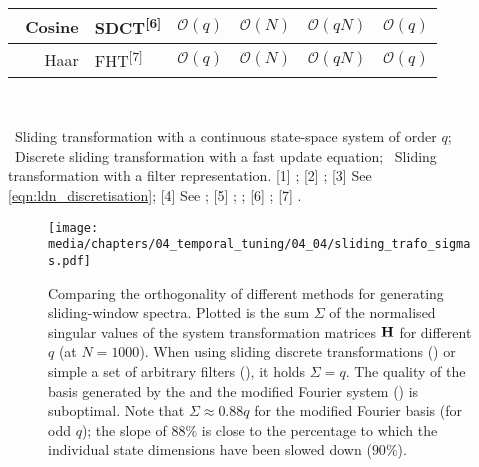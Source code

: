 \begin{table}[p]
{\begin{tabular}{r l c c c c}
		\midrule
		\symSDT~Cosine & SDCT\textsuperscript{[6]} & $\mathcal{O}(q)$ & $\mathcal{O}(N)$ & $\mathcal{O}(qN)$ & $\mathcal{O}(q)$ \\
		\midrule
		\symSDT~Haar & FHT\textsuperscript{[7]} & $\mathcal{O}(q)$ & $\mathcal{O}(N)$ & $\mathcal{O}(qN)$ & $\mathcal{O}(q)$ \\
		\bottomrule
	\end{tabular}\\[1em]
	}
	{\footnotesize
		\symLTI~Sliding transformation with a continuous \LTI state-space system of order $q$;
		\symSDT~Discrete sliding transformation with a fast update equation;
		\symFIR~Sliding transformation with a \FIR filter representation.
		[1] \cite{cooley1965algorithm};
		[2] \cite{gardner1995efficient};
		[3] See \cref{eqn:ldn_discretisation};
		[4] See ;
		[5] \cite{springer1991sliding}; \cite{jacobsen2003sliding};
		[6] \cite{kober2004fast};
		[7] \cite{kaiser1998fast}.
	}
\end{table}

\begin{figure}[p]
	\centering
	\texttt{[image: media/chapters/04\_temporal\_tuning/04\_04/sliding\_trafo\_sigmas.pdf]}
	\caption[Comparing the orthogonality of different methods for generating sliding-window spectra]{
		Comparing the orthogonality of different methods for generating sliding-window spectra.
		Plotted is the sum $\Sigma$ of the normalised singular values of the system transformation matrices $\mathbf{H}$ for different $q$ (at $N = 1000$).
		When using sliding discrete transformations (\symSDT) or simple a set of arbitrary \FIR filters (\symFIR), it holds $\Sigma = q$.
		The quality of the basis generated by the \LDN and the modified Fourier system (\symLTI) is suboptimal.
	Note that $\Sigma \approx 0.88q$ for the modified Fourier basis (for odd $q$); the slope of $88\%$ is close to the percentage to which the individual state dimensions have been slowed down ($90\%$).
	}
	\label{fig:sliding_trafo_sigmas}
\end{figure}

